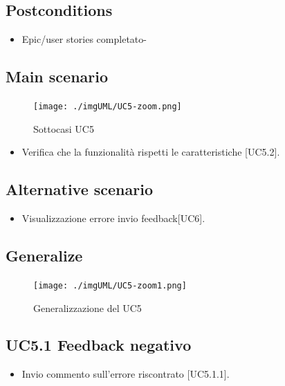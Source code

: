 \documentclass{article}
\begin{document}
    \subsection*{Postconditions}
    \begin{itemize}
        \item Epic/user stories completato-
    \end{itemize}
    
    \subsection*{Main scenario}
        \begin{figure}[h]
            \centering
            \texttt{[image: ./imgUML/UC5-zoom.png]}
            \caption{Sottocasi UC5}
            \label{fig:UC5_sottocasi}
        \end{figure}
        \begin{itemize}
            \item Verifica che la funzionalità rispetti le caratteristiche [UC5.2].
        \end{itemize}
        
    \subsection*{Alternative scenario}
    \begin{itemize}
        \item Visualizzazione errore invio feedback[UC6].
    \end{itemize}

    \subsection*{Generalize}
    \begin{figure}[h]
            \centering
            \texttt{[image: ./imgUML/UC5-zoom1.png]}
            \caption{Generalizzazione del UC5}
            \label{fig:UC5_generalizzazione}
        \end{figure}
    \subsection{UC5.1 Feedback negativo}
    \begin{itemize}
            \item Invio commento sull'errore riscontrato [UC5.1.1].
        \end{itemize}
        
\end{document}
